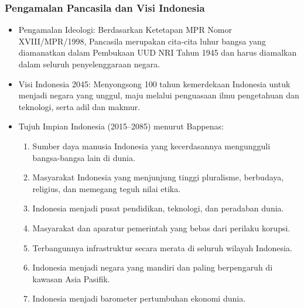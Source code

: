 \subsubsection{Pengamalan Pancasila dan Visi Indonesia}

\begin{itemize}
\item Pengamalan Ideologi: Berdasarkan Ketetapan MPR Nomor XVIII/MPR/1998, Pancasila merupakan cita-cita luhur bangsa yang diamanatkan dalam Pembukaan UUD NRI Tahun 1945 dan harus diamalkan dalam seluruh penyelenggaraan negara.
\item Visi Indonesia 2045: Menyongsong 100 tahun kemerdekaan Indonesia untuk menjadi negara yang unggul, maju melalui penguasaan ilmu pengetahuan dan teknologi, serta adil dan makmur.
\item Tujuh Impian Indonesia (2015--2085) menurut Bappenas:
  \begin{enumerate}
  \item Sumber daya manusia Indonesia yang kecerdasannya mengungguli bangsa-bangsa lain di dunia.
  \item Masyarakat Indonesia yang menjunjung tinggi pluralisme, berbudaya, religius, dan memegang teguh nilai etika.
  \item Indonesia menjadi pusat pendidikan, teknologi, dan peradaban dunia.
  \item Masyarakat dan aparatur pemerintah yang bebas dari perilaku korupsi.
  \item Terbangunnya infrastruktur secara merata di seluruh wilayah Indonesia.
  \item Indonesia menjadi negara yang mandiri dan paling berpengaruh di kawasan Asia Pasifik.
  \item Indonesia menjadi barometer pertumbuhan ekonomi dunia.
  \end{enumerate}
\end{itemize}
